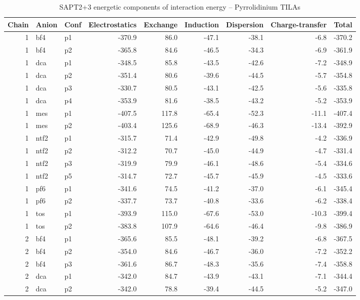\documentclass[a4paper]{article}
\begin{document}
\begin{table}[ht]
\centering
\footnotesize
\caption{SAPT2+3 energetic components of interaction energy -- Pyrrolidinium TILAs}
\begin{tabular}{rllrrrrrr}
  \hline
Chain & Anion & Conf & Electrostatics & Exchange & Induction & Dispersion & Charge-transfer & Total \\ 
  \hline
 1 & bf4 & p1 & -370.9 & 86.0 & -47.1 & -38.1 & -6.8 & -370.2 \\ 
   1 & bf4 & p2 & -365.8 & 84.6 & -46.5 & -34.3 & -6.9 & -361.9 \\ 
   1 & dca & p1 & -348.5 & 85.8 & -43.5 & -42.6 & -7.2 & -348.9 \\ 
   1 & dca & p2 & -351.4 & 80.6 & -39.6 & -44.5 & -5.7 & -354.8 \\ 
   1 & dca & p3 & -330.7 & 80.5 & -43.1 & -42.5 & -5.6 & -335.8 \\ 
   1 & dca & p4 & -353.9 & 81.6 & -38.5 & -43.2 & -5.2 & -353.9 \\ 
   1 & mes & p1 & -407.5 & 117.8 & -65.4 & -52.3 & -11.1 & -407.4 \\ 
   1 & mes & p2 & -403.4 & 125.6 & -68.9 & -46.3 & -13.4 & -392.9 \\ 
   1 & ntf2 & p1 & -315.7 & 71.4 & -42.9 & -49.8 & -4.2 & -336.9 \\ 
   1 & ntf2 & p2 & -312.2 & 70.7 & -45.0 & -44.9 & -4.7 & -331.4 \\ 
   1 & ntf2 & p3 & -319.9 & 79.9 & -46.1 & -48.6 & -5.4 & -334.6 \\ 
   1 & ntf2 & p5 & -314.7 & 72.7 & -45.7 & -45.9 & -4.5 & -333.6 \\ 
   1 & pf6 & p1 & -341.6 & 74.5 & -41.2 & -37.0 & -6.1 & -345.4 \\ 
   1 & pf6 & p2 & -337.7 & 73.7 & -40.8 & -33.6 & -6.2 & -338.4 \\ 
   1 & tos & p1 & -393.9 & 115.0 & -67.6 & -53.0 & -10.3 & -399.4 \\ 
   1 & tos & p2 & -383.8 & 107.9 & -64.6 & -46.4 & -9.8 & -386.9 \\ 
   2 & bf4 & p1 & -365.6 & 85.5 & -48.1 & -39.2 & -6.8 & -367.5 \\ 
   2 & bf4 & p2 & -354.0 & 84.6 & -46.7 & -36.0 & -7.2 & -352.2 \\ 
   2 & bf4 & p3 & -361.6 & 86.7 & -48.3 & -35.6 & -7.4 & -358.8 \\ 
   2 & dca & p1 & -342.0 & 84.7 & -43.9 & -43.1 & -7.1 & -344.4 \\ 
   2 & dca & p2 & -342.0 & 78.8 & -39.4 & -44.5 & -5.2 & -347.0 \\ 

\end{tabular}
\end{table}
\end{document}
